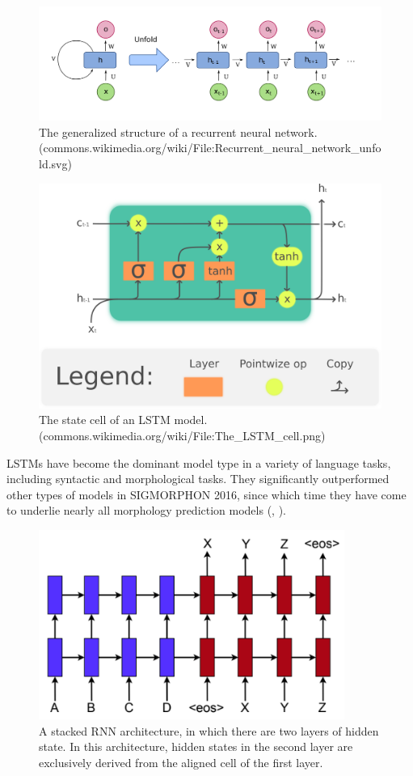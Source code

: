 \begin{figure}[ht]
\includegraphics[width=12cm]{images/RNN.png}
\centering
\caption{The generalized structure of a recurrent neural network. (commons.wikimedia.org/wiki/File:Recurrent\_neural\_network\_unfold.svg)}
\end{figure}

\begin{figure}[ht]
\includegraphics[width=12cm]{images/The_LSTM_cell.png}
\centering
\caption{The state cell of an LSTM model. (commons.wikimedia.org/wiki/File:The\_LSTM\_cell.png)}
\end{figure}

LSTMs have become the dominant model type in a variety of language tasks, including syntactic and morphological tasks. They significantly outperformed other types of models in SIGMORPHON 2016, since which time they have come to underlie nearly all morphology prediction models (\cite{Cotterell2016}, \cite{Cotterell2017a}).

\begin{figure}[ht]
\includegraphics[width=10cm]{images/stacked.png}
\centering
\caption{A stacked RNN architecture, in which there are two layers of hidden state. In this architecture, hidden states in the second layer are exclusively derived from the aligned cell of the first layer. \parencite{Luong2015}}
\end{figure}

